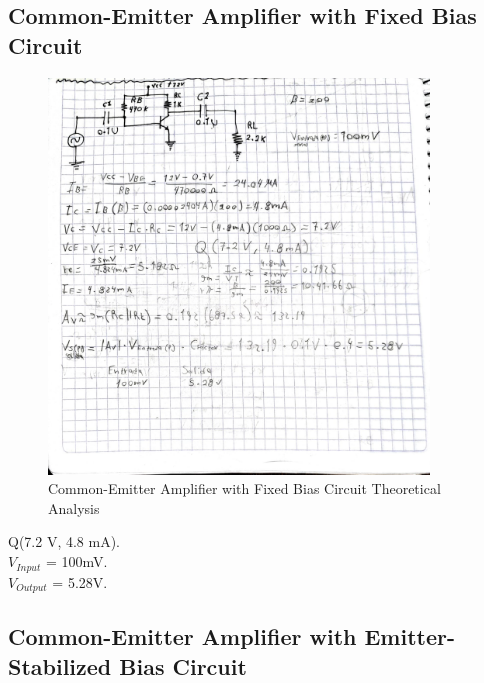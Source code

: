 \subsection{Common-Emitter Amplifier with Fixed Bias Circuit}

\begin{figure}[H]
    \centering
    \includegraphics[width = 0.9\textwidth]{Imagenes/Imagenes_Juan/AnalisisTeorico_Circuito1.jpg}
    \caption{Common-Emitter Amplifier with Fixed Bias Circuit Theoretical Analysis}
    \label{circuit1Teorico}
\end{figure}

\begin{center}
    Q(7.2 V, 4.8 mA). \\
    \texorpdfstring{$V_{Input}$}{Vinput} = 100mV. \\
    \texorpdfstring{$V_{Output}$}{Voutput} = 5.28V.
\end{center}

\subsection{Common-Emitter Amplifier with Emitter-Stabilized Bias Circuit}

